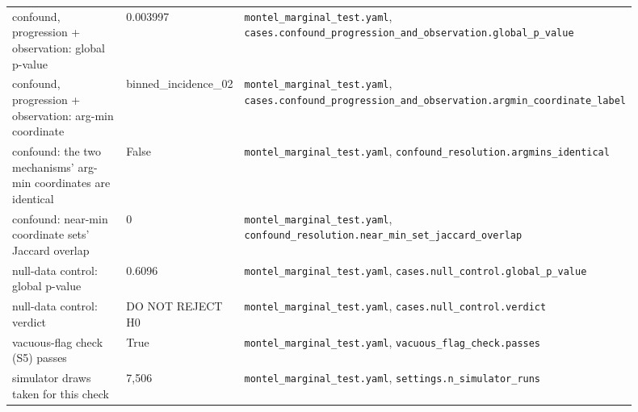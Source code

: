 \begin{longtable}{p{0.35\linewidth} p{0.14\linewidth} p{0.41\linewidth}}
confound, progression + observation: global p-value & 0.003997 & \texttt{\footnotesize montel\_\allowbreak{}marginal\_\allowbreak{}test.\allowbreak{}yaml}, \texttt{\footnotesize cases.\allowbreak{}confound\_\allowbreak{}progression\_\allowbreak{}and\_\allowbreak{}observation.\allowbreak{}global\_\allowbreak{}p\_\allowbreak{}value} \\
confound, progression + observation: arg-min coordinate & binned\_incidence\_02 & \texttt{\footnotesize montel\_\allowbreak{}marginal\_\allowbreak{}test.\allowbreak{}yaml}, \texttt{\footnotesize cases.\allowbreak{}confound\_\allowbreak{}progression\_\allowbreak{}and\_\allowbreak{}observation.\allowbreak{}argmin\_\allowbreak{}coordinate\_\allowbreak{}label} \\
confound: the two mechanisms' arg-min coordinates are identical & False & \texttt{\footnotesize montel\_\allowbreak{}marginal\_\allowbreak{}test.\allowbreak{}yaml}, \texttt{\footnotesize confound\_\allowbreak{}resolution.\allowbreak{}argmins\_\allowbreak{}identical} \\
confound: near-min coordinate sets' Jaccard overlap & 0 & \texttt{\footnotesize montel\_\allowbreak{}marginal\_\allowbreak{}test.\allowbreak{}yaml}, \texttt{\footnotesize confound\_\allowbreak{}resolution.\allowbreak{}near\_\allowbreak{}min\_\allowbreak{}set\_\allowbreak{}jaccard\_\allowbreak{}overlap} \\
null-data control: global p-value & 0.6096 & \texttt{\footnotesize montel\_\allowbreak{}marginal\_\allowbreak{}test.\allowbreak{}yaml}, \texttt{\footnotesize cases.\allowbreak{}null\_\allowbreak{}control.\allowbreak{}global\_\allowbreak{}p\_\allowbreak{}value} \\
null-data control: verdict & DO NOT REJECT H0 & \texttt{\footnotesize montel\_\allowbreak{}marginal\_\allowbreak{}test.\allowbreak{}yaml}, \texttt{\footnotesize cases.\allowbreak{}null\_\allowbreak{}control.\allowbreak{}verdict} \\
vacuous-flag check (S5) passes & True & \texttt{\footnotesize montel\_\allowbreak{}marginal\_\allowbreak{}test.\allowbreak{}yaml}, \texttt{\footnotesize vacuous\_\allowbreak{}flag\_\allowbreak{}check.\allowbreak{}passes} \\
simulator draws taken for this check & 7,506 & \texttt{\footnotesize montel\_\allowbreak{}marginal\_\allowbreak{}test.\allowbreak{}yaml}, \texttt{\footnotesize settings.\allowbreak{}n\_\allowbreak{}simulator\_\allowbreak{}runs} \\
\bottomrule
\end{longtable}

